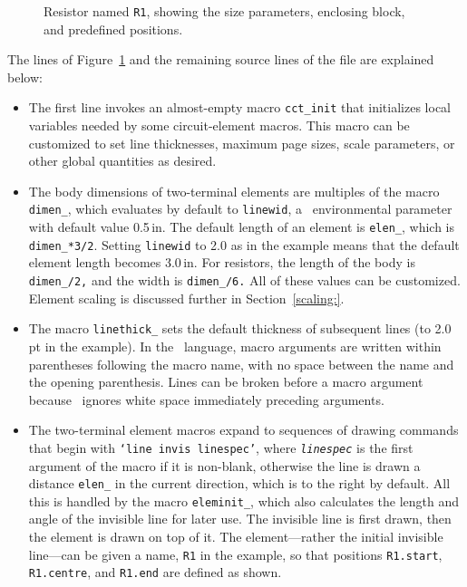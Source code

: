 \begin{figure}[hbt]
   
   \caption{Resistor named {\tt R1}, showing the size parameters,
     enclosing block, and predefined positions.}
   \label{BigResistor}
   \end{figure}
The lines of Figure~\ref{BigResistor}
and the remaining source lines of the file are explained below:
\begin{itemize}
\item The first line invokes an almost-empty macro {\tt cct\_init} that
   initializes local variables needed by some circuit-element macros.  This
   macro can be customized to set line thicknesses, maximum page sizes, scale
   parameters, or other global quantities as desired.
\item The body dimensions of two-terminal elements are multiples of the macro
   {\tt dimen\_}, which evaluates by default to {\tt linewid}, a
   \pic\ environmental parameter with default value 0.5\,in.  The default
   length of an element is {\tt elen\_}, which is {\tt dimen\_*3/2}.
   Setting {\tt linewid} to 2.0 as in the example means that the default element
   length becomes 3.0\,in.
   For resistors, the length of the body is {\tt dimen\_/2,} and the
   width is {\tt dimen\_/6.} All of these values can be customized.
   Element scaling is discussed further in Section~\ref{scaling:}.
\item The macro {\tt linethick\_} sets the default thickness of subsequent
   lines (to 2.0\,pt in the example).
   In the \Mfour\ language, macro arguments are written within parentheses
   following the macro name, with no space between the name and the
   opening parenthesis.  Lines can be broken before a macro argument
   because \Mfour\ ignores white space immediately preceding arguments.
\item The two-terminal element macros expand to sequences of drawing commands
   that begin with {\tt `line invis {\sl linespec}'},
   where {\tt\sl linespec} is the first argument of the macro if it
   is non-blank, otherwise the line is drawn a distance
   {\tt elen\_} in the current direction, which is to the right by
   default. All this is handled by the macro {\tt eleminit\_},
   which also calculates the length and angle of the invisible line for
   later use.  The invisible line is first drawn, then the element is drawn
   on top of it.
   The element---rather the initial invisible line---can
   be given a name, {\tt R1} in the example, so that positions
   {\tt R1.start}, {\tt R1.centre}, and {\tt R1.end} are defined as shown.

\end{itemize}
